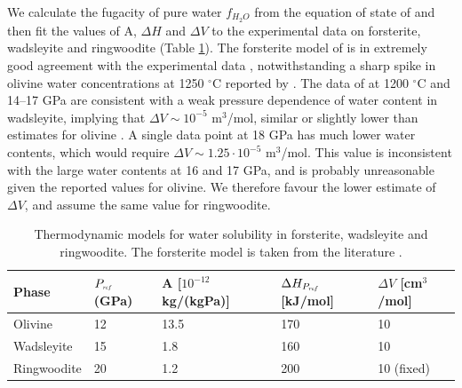 \documentclass[review]{elsarticle}
\begin{document}
We calculate the fugacity of pure water $f_{H_2O}$ from the equation of state of \cite{PS1995} and then fit the values of A, $\Delta H$ and $\Delta V$ to the experimental data on forsterite, wadsleyite and ringwoodite (Table \ref{table:partitioning}). The forsterite model of \cite{ZGK2004} is in extremely good agreement with the experimental data \citep{SFNHB2006, LSKO2009}, notwithstanding a sharp spike in olivine water concentrations at 1250 $^{\circ}$C reported by \cite{SFNHB2006}. The data of \cite{DDFK2005} at 1200 $^{\circ}$C and 14--17 GPa are consistent with a weak pressure dependence of water content in wadsleyite, implying that $\Delta V \sim 10^{-5}$ m$^3$/mol, similar or slightly lower than estimates for olivine \citep[1.00 -- 1.06 $\cdot 10^{-5}$ m$^3$/mol][]{KKR1996, ZGK2004, MDAR2006}. A single data point at 18 GPa has much lower water contents, which would require $\Delta V \sim 1.25 \cdot 10^{-5}$ m$^3$/mol. This value is inconsistent with the large water contents at 16 and 17 GPa, and is probably unreasonable given the reported values for olivine. We therefore favour the lower estimate of $\Delta V$, and assume the same value for ringwoodite.

\begin{table}[]
\centering
\caption{Thermodynamic models for water solubility in forsterite, wadsleyite and ringwoodite. The forsterite model is taken from the literature \cite{ZGK2004}.}
\label{table:partitioning}
\begin{tabular}{lllll}
Phase & $P_{\textit{\tiny{ref}}}$ (GPa) & A [$10^{-12}$ kg/(kgPa)] & $\Delta H_{P_{\textit{\tiny{ref}}}}$ [kJ/mol] & $\Delta V$ [cm$^3$/mol] \\
\hline
Olivine & 12 & 13.5 & 170 & 10 \\
Wadsleyite & 15 & 1.8 & 160 & 10 \\
Ringwoodite & 20 & 1.2 & 200 & 10 (fixed)
\end{tabular}
\end{table}
\end{document}

